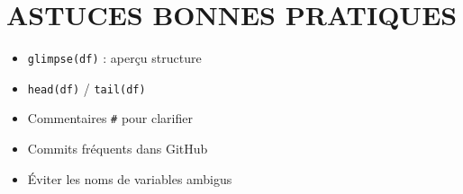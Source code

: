 \documentclass[
  8pt,
  letterpaper,
  DIV=11,
  numbers=noendperiod]{scrartcl}
\providecommand{\tightlist}{%
  \setlength{\itemsep}{0pt}\setlength{\parskip}{0pt}}
\begin{document}
\section{ASTUCES BONNES PRATIQUES}\label{astuces-bonnes-pratiques}

\begin{itemize}
\tightlist
\item
  \texttt{glimpse(df)} : aperçu structure
\item
  \texttt{head(df)} / \texttt{tail(df)}
\item
  Commentaires \texttt{\#} pour clarifier
\item
  Commits fréquents dans GitHub
\item
  Éviter les noms de variables ambigus
\end{itemize}
\end{document}
